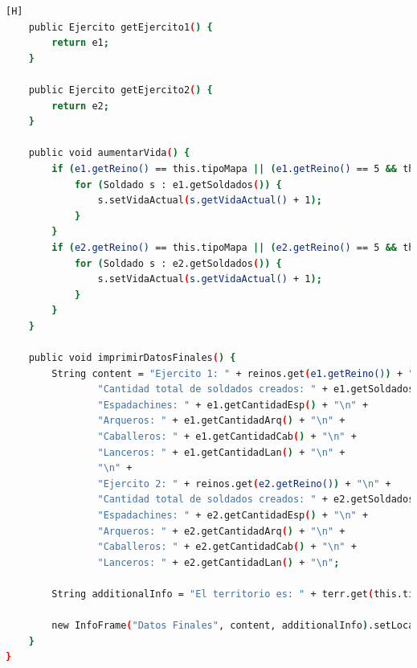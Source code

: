 \documentclass{article}
\begin{document}
\begin{lstlisting}[language=bash,caption={CLASE Mapa}][H]
    public Ejercito getEjercito1() {
        return e1;
    }

    public Ejercito getEjercito2() {
        return e2;
    }

    public void aumentarVida() {
        if (e1.getReino() == this.tipoMapa || (e1.getReino() == 5 && this.tipoMapa == 1 || e1.getReino() == 5 && this.tipoMapa == 2)) {
            for (Soldado s : e1.getSoldados()) {
                s.setVidaActual(s.getVidaActual() + 1);
            }
        }
        if (e2.getReino() == this.tipoMapa || (e2.getReino() == 5 && this.tipoMapa == 1 || e2.getReino() == 5 && this.tipoMapa == 2)) {
            for (Soldado s : e2.getSoldados()) {
                s.setVidaActual(s.getVidaActual() + 1);
            }
        }
    }

    public void imprimirDatosFinales() {
        String content = "Ejercito 1: " + reinos.get(e1.getReino()) + "\n" +
                "Cantidad total de soldados creados: " + e1.getSoldados().size() + "\n" +
                "Espadachines: " + e1.getCantidadEsp() + "\n" +
                "Arqueros: " + e1.getCantidadArq() + "\n" +
                "Caballeros: " + e1.getCantidadCab() + "\n" +
                "Lanceros: " + e1.getCantidadLan() + "\n" +
                "\n" +
                "Ejercito 2: " + reinos.get(e2.getReino()) + "\n" +
                "Cantidad total de soldados creados: " + e2.getSoldados().size() + "\n" +
                "Espadachines: " + e2.getCantidadEsp() + "\n" +
                "Arqueros: " + e2.getCantidadArq() + "\n" +
                "Caballeros: " + e2.getCantidadCab() + "\n" +
                "Lanceros: " + e2.getCantidadLan() + "\n";

        String additionalInfo = "El territorio es: " + terr.get(this.tipoMapa) + "\n";

        new InfoFrame("Datos Finales", content, additionalInfo).setLocation(1000, 500);
    }
}

	\end{lstlisting}	
	
	
			
\end{document}
